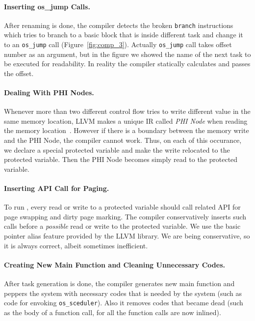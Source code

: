 \paragraph{Inserting os\_jump Calls.} 

After renaming is done, the compiler detects the broken {\tt branch} instructions which tries to branch to a
basic block that is inside different task and change it to an {\tt os\_jump} call (Figure~\ref{fig:comp_3}).
Actually {\tt os\_jump} call takes offset number as an argument, but in the figure we showed the name of the
next task to be executed for readability. In reality the compiler statically calculates and passes the offset.

\paragraph{Dealing With PHI Nodes.} 

Whenever more than two different control flow tries to write different value in the same memory location,
LLVM makes a unique IR called {\em PHI Node} when reading the memory location~\cite{citationneeded}.
However if there is a boundary between the memory write and the PHI Node, the compiler cannot work.
Thus, on each of this occurance, we declare a special protected variable and make the write relocated to the
protected variable. Then the PHI Node becomes simply read to the protected variable.

\paragraph{Inserting API Call for Paging.} 

To run \sys, every read or write to a protected variable should call related API for page swapping and dirty page
marking. The compiler conservatively inserts such calls before a {\em possible} read or write to the protected variable.
We use the basic pointer alias feature provided by the LLVM library. We are being conservative, so it is always correct,
albeit sometimes inefficient.

\paragraph{Creating New Main Function and Cleaning Unnecessary Codes.} 

After task generation is done, the compiler generates new main function and peppers the system with
necessary codes that is needed by the system (such as code for envoking {\tt os\_sceduler}).
Also it removes codes that became dead (such as the body of a function call, for all the function calls are now inlined).


